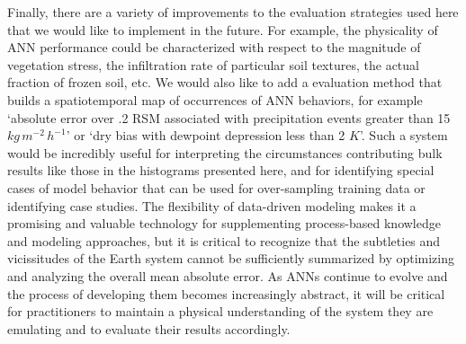 Finally, there are a variety of improvements to the evaluation strategies used here that we would like to implement in the future. For example, the physicality of ANN performance could be characterized with respect to the magnitude of vegetation stress, the infiltration rate of particular soil textures, the actual fraction of frozen soil, etc. We would also like to add a evaluation method that builds a spatiotemporal map of occurrences of ANN behaviors, for example `absolute error over .2 RSM associated with precipitation events greater than 15 $kg\,m^{-2}\,h^{-1}$' or `dry bias with dewpoint depression less than 2 $K$'. Such a system would be incredibly useful for interpreting the circumstances contributing bulk results like those in the histograms presented here, and for identifying special cases of model behavior that can be used for over-sampling training data or identifying case studies. The flexibility of data-driven modeling makes it a promising and valuable technology for supplementing process-based knowledge and modeling approaches, but it is critical to recognize that the subtleties and vicissitudes of the Earth system cannot be sufficiently summarized by optimizing and analyzing the overall mean absolute error. As ANNs continue to evolve and the process of developing them becomes increasingly abstract, it will be critical for practitioners to maintain a physical understanding of the system they are emulating and to evaluate their results accordingly.
